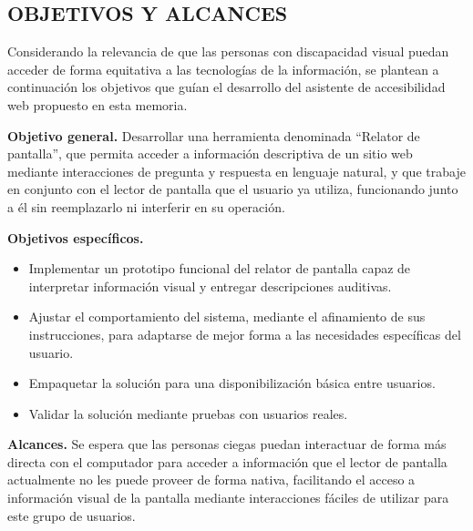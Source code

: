 \subsection{OBJETIVOS Y ALCANCES}

Considerando la relevancia de que las personas con discapacidad visual puedan acceder de forma equitativa a las tecnologías de la información, se plantean a continuación los objetivos que guían el desarrollo del asistente de accesibilidad web propuesto en esta memoria.

\textbf{Objetivo general.} Desarrollar una herramienta denominada ``Relator de pantalla'', que permita acceder a información descriptiva de un sitio web mediante interacciones de pregunta y respuesta en lenguaje natural, y que trabaje en conjunto con el lector de pantalla que el usuario ya utiliza, funcionando junto a él sin reemplazarlo ni interferir en su operación.

\textbf{Objetivos específicos.}

\begin{itemize}
    \item[(a)] Implementar un prototipo funcional del relator de pantalla capaz de interpretar información visual y entregar descripciones auditivas.
    \item[(b)] Ajustar el comportamiento del sistema, mediante el afinamiento de sus instrucciones, para adaptarse de mejor forma a las necesidades específicas del usuario.
    \item[(c)] Empaquetar la solución para una disponibilización básica entre usuarios.
    \item[(d)] Validar la solución mediante pruebas con usuarios reales.
\end{itemize}

\textbf{Alcances.} Se espera que las personas ciegas puedan interactuar de forma más directa con el computador para acceder a información que el lector de pantalla actualmente no les puede proveer de forma nativa, facilitando el acceso a información visual de la pantalla mediante interacciones fáciles de utilizar para este grupo de usuarios.
